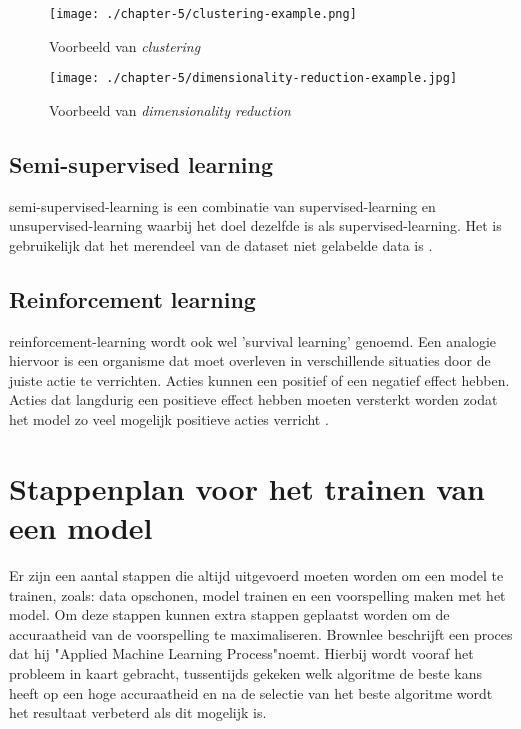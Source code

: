 \begin{figure}[hbt!]
    \centering
    \begin{minipage}{0.3\textwidth}
        \centering
        \texttt{[image: ./chapter-5/clustering-example.png]}
        \caption{Voorbeeld van \textit{clustering}}
        \label{fig:clustering-example}
    \end{minipage}\hfill
    \begin{minipage}{0.6\textwidth}
        \centering
        \texttt{[image: ./chapter-5/dimensionality-reduction-example.jpg]}
        \caption{Voorbeeld van \textit{dimensionality reduction}}
        \label{fig:dimensionality-reduction-example}
    \end{minipage}
\end{figure}

\subsection{Semi-supervised learning}\label{subsec:semi-supervised-learning}
\Gls{semi-supervised-learning} is een combinatie van \gls{supervised-learning} en \gls{unsupervised-learning} waarbij het doel dezelfde is als \gls{supervised-learning}. Het is gebruikelijk dat het merendeel van de dataset niet gelabelde data is \cite{the-hundred-page-machine-learning-book}.

\subsection{Reinforcement learning}\label{subsec:reinforcement-learning}
\Gls{reinforcement-learning} wordt ook wel 'survival learning' genoemd. Een analogie hiervoor is een organisme dat moet overleven in verschillende situaties door de juiste actie te verrichten. Acties kunnen een positief of een negatief effect hebben. Acties dat langdurig een positieve effect hebben moeten versterkt worden zodat het model zo veel mogelijk positieve acties verricht \cite{bayesian-reasoning-and-machine-learning-book}.



\section{Stappenplan voor het trainen van een model}\label{sec:stappenplan-voor-het-trainen-van-een-model}
Er zijn een aantal stappen die altijd uitgevoerd moeten worden om een model te trainen, zoals: data opschonen, model trainen en een voorspelling maken met het model. Om deze stappen kunnen extra stappen geplaatst worden om de accuraatheid van de voorspelling te maximaliseren. Brownlee \cite{ml-applied-ml-process-brownlee} beschrijft een proces dat hij "Applied Machine Learning Process"\space noemt. Hierbij wordt vooraf het probleem in kaart gebracht, tussentijds gekeken welk algoritme de beste kans heeft op een hoge accuraatheid en na de selectie van het beste algoritme wordt het resultaat verbeterd als dit mogelijk is.

